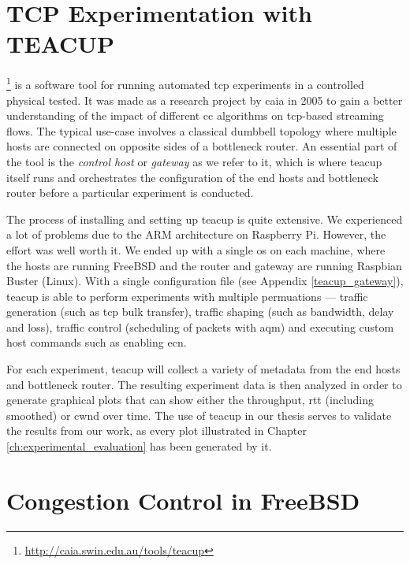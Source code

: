 \section{TCP Experimentation with TEACUP}

 \footnote{\url{http://caia.swin.edu.au/tools/teacup}} is a software tool for running automated \gls{tcp} experiments in a controlled physical tested. It was made as a research project by \gls{caia} in 2005 to gain a better understanding of the impact of different \gls{cc} algorithms on \gls{tcp}-based streaming flows. \cite{teacup} The typical use-case involves a classical dumbbell topology where multiple hosts are connected on opposite sides of a bottleneck router. An essential part of the tool is the \textit{control host} or \textit{gateway} as we refer to it, which is where \gls{teacup} itself runs and orchestrates the configuration of the end hosts and bottleneck router before a particular experiment is conducted.

The process of installing and setting up \gls{teacup} is quite extensive. We experienced a lot of problems due to the ARM architecture on Raspberry Pi. However, the effort was well worth it. We ended up with a single \gls{os} on each machine, where the hosts are running FreeBSD and the router and gateway are running Raspbian Buster (Linux). With a single configuration file (see Appendix \ref{teacup_gateway}), \gls{teacup} is able to perform experiments with multiple permuations --- traffic generation (such as \gls{tcp} bulk transfer), traffic shaping (such as bandwidth, delay and loss), traffic control (scheduling of packets with \gls{aqm}) and executing custom host commands such as enabling \gls{ecn}.

For each experiment, \gls{teacup} will collect a variety of metadata from the end hosts and bottleneck router. The resulting experiment data is then analyzed in order to generate graphical plots that can show either the throughput, \gls{rtt} (including smoothed) or \gls{cwnd} over time. The use of \gls{teacup} in our thesis serves to validate the results from our work, as every plot illustrated in Chapter \ref{ch:experimental_evaluation} has been generated by it.










\section{Congestion Control in FreeBSD} \label{sec:cc_in_freebsd}

